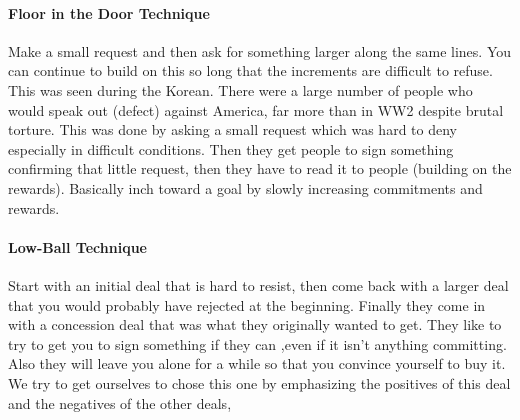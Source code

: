 \documentclass{article}
\begin{document}
\paragraph*{Floor in the Door Technique} Make a small request and then ask for something larger along the same lines. You can continue to build on this so long that the increments are difficult to refuse. This was seen during the Korean. There were a large number of people who would speak out (defect) against America, far more than in WW2 despite brutal torture. This was done by asking a small request which was hard to deny especially in difficult conditions. Then they get people to sign something confirming that little request, then they have to read it to people (building on the rewards). Basically inch toward a goal by slowly increasing commitments and rewards.
\paragraph*{Low-Ball Technique} Start with an initial deal that is hard to resist, then come back with a larger deal that you would probably have rejected at the beginning. Finally they come in with a concession deal that was what they originally wanted to get. They like to try to get you to sign something if they can ,even if it isn’t anything committing. Also they will leave you alone for a while so that you convince yourself to buy it. We try to get ourselves to chose this one by emphasizing the positives of this deal and the negatives of the other deals, 
\end{document}
